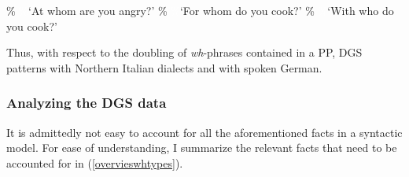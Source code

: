 \begin{exe}
\ex\label{doublingphrases}
\begin{xlist} 
\ex \%
%
\glt \textcolor{white}{\%}`At whom are you angry?' \label{ex:doublingphrasesa} 
\ex \%
%
\glt \textcolor{white}{\%}`For whom do you cook?' \label{ex:doublingphrasesb} 
\ex \%
%
\glt \textcolor{white}{\%}`With who do you cook?' \label{ex:doublingphrasesc} 
\end{xlist}
\end{exe}

\noindent Thus, with respect to the doubling of \textit{wh}-phrases contained in a PP, DGS patterns with Northern Italian dialects and with spoken German. 



\largerpage
\subsubsection{Analyzing the DGS data}

\noindent It is admittedly not easy to account for all the aforementioned facts in a syntactic model. For ease of understanding, I summarize the relevant facts that need to be accounted for in (\ref{overvieswhtypes}).


